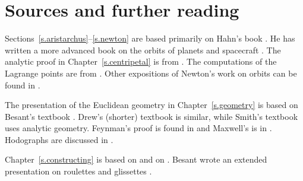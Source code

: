 
\chapter*{Sources and further reading}


Sections~\ref{s.aristarchus}--\ref{s.newton} are based primarily on Hahn's book \cite{hahn-cic}. He has written a more advanced book on the orbits of planets and spacecraft \cite{hahn-orbits}. The analytic proof in Chapter~\ref{s.centripetal} is from \cite{griffiths}. The computations of the Lagrange points are from \cite{stern}. Other expositions of Newton's work on orbits can be found in \cite{hauser-lang,stein}. 

The presentation of the Euclidean geometry in Chapter~\ref{s.geometry} is based on Besant's textbook \cite{besant}. Drew's (shorter) textbook \cite{drew} is similar, while Smith's textbook \cite{smith} uses analytic geometry. Feynman's proof is found in \cite{lost} and Maxwell's is in \cite[Article CXXXIII]{maxwell}. Hodographs are discussed in \cite{hodograph}.

Chapter~\ref{s.constructing} is based on \cite[Chapter~X]{besant} and on \cite{van-maanen}. Besant wrote an extended presentation on roulettes and glissettes \cite{besant-r-g}.

\begin{small}


\end{small}
